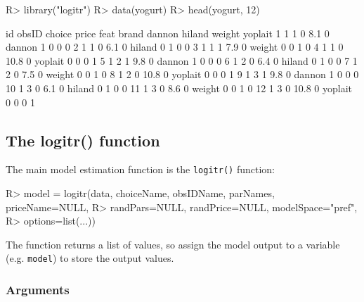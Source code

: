 \documentclass[article]{jss}
\begin{document}
\begin{CodeChunk}

\begin{CodeInput}
R> library("logitr")
R> data(yogurt)
R> head(yogurt, 12)
\end{CodeInput}

\begin{CodeOutput}
   id obsID choice price feat   brand dannon hiland weight yoplait
1   1     1      0   8.1    0  dannon      1      0      0       0
2   1     1      0   6.1    0  hiland      0      1      0       0
3   1     1      1   7.9    0  weight      0      0      1       0
4   1     1      0  10.8    0 yoplait      0      0      0       1
5   1     2      1   9.8    0  dannon      1      0      0       0
6   1     2      0   6.4    0  hiland      0      1      0       0
7   1     2      0   7.5    0  weight      0      0      1       0
8   1     2      0  10.8    0 yoplait      0      0      0       1
9   1     3      1   9.8    0  dannon      1      0      0       0
10  1     3      0   6.1    0  hiland      0      1      0       0
11  1     3      0   8.6    0  weight      0      0      1       0
12  1     3      0  10.8    0 yoplait      0      0      0       1
\end{CodeOutput}
\end{CodeChunk}

\hypertarget{the-logitr-function}{%
\subsection{The logitr() function}\label{the-logitr-function}}

The main model estimation function is the \texttt{logitr()} function:

\begin{CodeChunk}

\begin{CodeInput}
R> model = logitr(data, choiceName, obsIDName, parNames, priceName=NULL,
R>             randPars=NULL, randPrice=NULL, modelSpace="pref",
R>             options=list(...))
\end{CodeInput}
\end{CodeChunk}

The function returns a list of values, so assign the model output to a
variable (e.g. \texttt{model}) to store the output values.

\hypertarget{arguments}{%
\subsubsection{Arguments}\label{arguments}}
\end{document}
